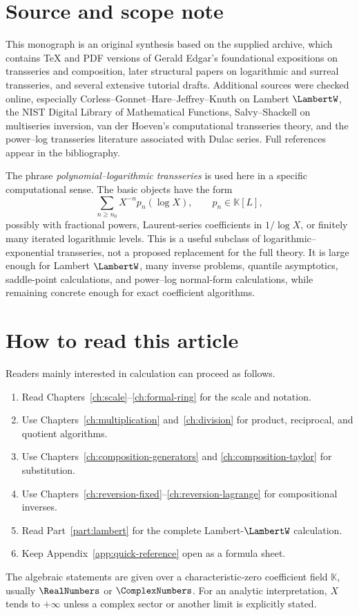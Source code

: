 \documentclass[11pt,oneside]{book}
\theoremstyle{definition}
\theoremstyle{remark}
\newcommand{\K}{\mathbb K}
\begin{document}
\chapter*{Source and scope note}
This monograph is an original synthesis based on the supplied archive, which
contains TeX and PDF versions of Gerald Edgar's foundational expositions on
transseries and composition, later structural papers on logarithmic and
surreal transseries, and several extensive tutorial drafts.  Additional
sources were checked online, especially Corless--Gonnet--Hare--Jeffrey--Knuth
on Lambert $\LambertW$, the NIST Digital Library of Mathematical Functions,
Salvy--Shackell on multiseries inversion, van der Hoeven's computational
transseries theory, and the power--log transseries literature associated with
Dulac series.  Full references appear in the bibliography.

The phrase \emph{polynomial--logarithmic transseries} is used here in a
specific computational sense.  The basic objects have the form
\[
 \sum_{n\ge n_0}X^{-n}p_n(\log X),
 \qquad p_n\in\K[L],
\]
possibly with fractional powers, Laurent-series coefficients in
$1/\log X$, or finitely many iterated logarithmic levels.  This is a useful
subclass of logarithmic--exponential transseries, not a proposed replacement
for the full theory.  It is large enough for Lambert $\LambertW$, many inverse
problems, quantile asymptotics, saddle-point calculations, and power--log
normal-form calculations, while remaining concrete enough for exact
coefficient algorithms.

\chapter*{How to read this article}
Readers mainly interested in calculation can proceed as follows.
\begin{enumerate}
\item Read Chapters~\ref{ch:scale}--\ref{ch:formal-ring} for the scale and
      notation.
\item Use Chapters~\ref{ch:multiplication} and~\ref{ch:division} for product,
      reciprocal, and quotient algorithms.
\item Use Chapters~\ref{ch:composition-generators} and
      \ref{ch:composition-taylor} for substitution.
\item Use Chapters~\ref{ch:reversion-fixed}--\ref{ch:reversion-lagrange} for
      compositional inverses.
\item Read Part~\ref{part:lambert} for the complete Lambert-$\LambertW$ calculation.
\item Keep Appendix~\ref{app:quick-reference} open as a formula sheet.
\end{enumerate}
The algebraic statements are given over a characteristic-zero coefficient
field $\K$, usually $\RealNumbers$ or $\ComplexNumbers$.  For an analytic interpretation, $X$ tends
to $+\infty$ unless a complex sector or another limit is explicitly stated.
\end{document}
